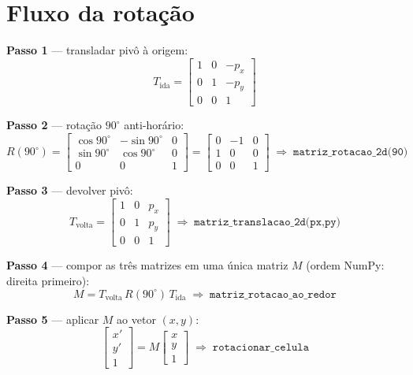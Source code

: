 \documentclass[conference,onecolumn]{IEEEtran}
\begin{document}
\section{Fluxo da rotação}
\label{sec:fluxo}

\textbf{Passo 1} --- transladar pivô à origem:
\begin{equation}
T_{\text{ida}}=
\begin{bmatrix}1&0&-p_x\\0&1&-p_y\\0&0&1\end{bmatrix}
\end{equation}

\textbf{Passo 2} --- rotação $90^\circ$ anti-horário:
\begin{equation}
R(90^\circ)=
\begin{bmatrix}\cos 90^\circ&-\sin 90^\circ&0\\\sin 90^\circ&\cos 90^\circ&0\\0&0&1\end{bmatrix}
=
\begin{bmatrix}0&-1&0\\1&0&0\\0&0&1\end{bmatrix}
\;\Longrightarrow\;
\texttt{matriz\_rotacao\_2d(90)}
\label{eq:R90}
\end{equation}

\textbf{Passo 3} --- devolver pivô:
\begin{equation}
T_{\text{volta}}=
\begin{bmatrix}1&0&p_x\\0&1&p_y\\0&0&1\end{bmatrix}
\;\Longrightarrow\;
\texttt{matriz\_translacao\_2d(px,py)}
\end{equation}

\textbf{Passo 4} --- compor as três matrizes em uma única matriz $M$ (ordem NumPy: direita primeiro):
\begin{equation}
\boxed{M = T_{\text{volta}}\, R(90^\circ)\, T_{\text{ida}}}
\;\Longrightarrow\;
\texttt{matriz\_rotacao\_ao\_redor}
\label{eq:M}
\end{equation}

\textbf{Passo 5} --- aplicar $M$ ao vetor $(x,y)$:
\begin{equation}
\begin{bmatrix}x'\\y'\\1\end{bmatrix}
= M\begin{bmatrix}x\\y\\1\end{bmatrix}
\;\Longrightarrow\;
\texttt{rotacionar\_celula}
\label{eq:apply}
\end{equation}
\end{document}
